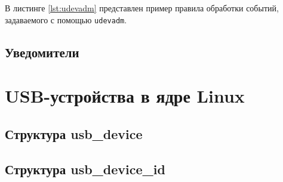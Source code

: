 В листинге \ref{lst:udevadm} представлен пример правила обработки событий, задаваемого с помощью \texttt{udevadm}.


\subsection{Уведомители}

\section{USB-устройства в ядре Linux}

\subsection{Структура usb\_device}

\subsection{Структура usb\_device\_id}